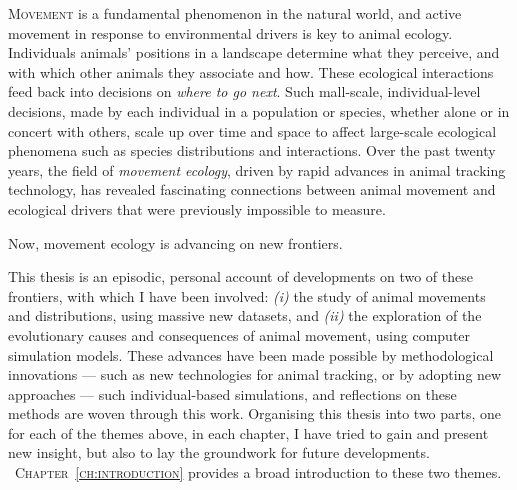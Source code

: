 \label{ch:abstract}


\lettrine{M}{ovement} is a fundamental phenomenon in the natural world, and active movement in response to environmental drivers is key to animal ecology.
Individuals animals' positions in a landscape determine what they perceive, and with which other animals they associate and how.
These ecological interactions feed back into decisions on \textit{where to go next}.
Such mall-scale, individual-level decisions, made by each individual in a population or species, whether alone or in concert with others, scale up over time and space to affect large-scale ecological phenomena such as species distributions and interactions.
Over the past twenty years, the field of \textit{movement ecology}, driven by rapid advances in animal tracking technology, has revealed fascinating connections between animal movement and ecological drivers that were previously impossible to measure.

\noindent Now, movement ecology is advancing on new frontiers.%

\noindent This thesis is an episodic, personal account of developments on two of these frontiers, with which I have been involved: \textit{(i)} the study of animal movements and distributions, using massive new datasets, and \textit{(ii)} the exploration of the evolutionary causes and consequences of animal movement, using computer simulation models.
These advances have been made possible by methodological innovations --- such as new technologies for animal tracking, or by adopting new approaches --- such individual-based simulations, and reflections on these methods are woven through this work. 
Organising this thesis into two parts, one for each of the themes above, in each chapter, I have tried to gain and present new insight, but also to lay the groundwork for future developments.
{\scshape~Chapter~\ref{ch:introduction}} provides a broad introduction to these two themes.

